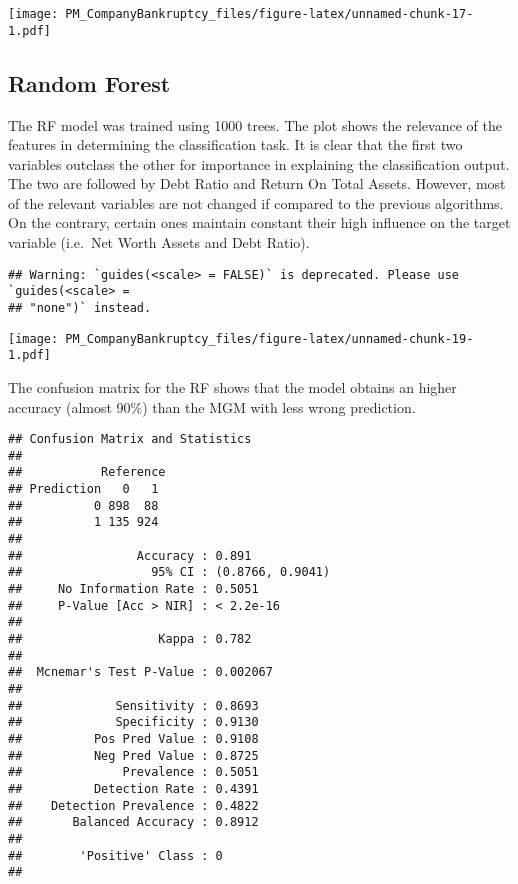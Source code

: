 \documentclass[
]{article}
\begin{document}
\texttt{[image: PM\_CompanyBankruptcy\_files/figure-latex/unnamed-chunk-17-1.pdf]}

\hypertarget{random-forest}{%
\subsection{Random Forest}\label{random-forest}}

The RF model was trained using 1000 trees. The plot shows the relevance
of the features in determining the classification task. It is clear that
the first two variables outclass the other for importance in explaining
the classification output. The two are followed by Debt Ratio and Return
On Total Assets. However, most of the relevant variables are not changed
if compared to the previous algorithms. On the contrary, certain ones
maintain constant their high influence on the target variable (i.e.~Net
Worth Assets and Debt Ratio).

\begin{verbatim}
## Warning: `guides(<scale> = FALSE)` is deprecated. Please use `guides(<scale> =
## "none")` instead.
\end{verbatim}

\texttt{[image: PM\_CompanyBankruptcy\_files/figure-latex/unnamed-chunk-19-1.pdf]}

The confusion matrix for the RF shows that the model obtains an higher
accuracy (almost 90\%) than the MGM with less wrong prediction.

\begin{verbatim}
## Confusion Matrix and Statistics
## 
##           Reference
## Prediction   0   1
##          0 898  88
##          1 135 924
##                                           
##                Accuracy : 0.891           
##                  95% CI : (0.8766, 0.9041)
##     No Information Rate : 0.5051          
##     P-Value [Acc > NIR] : < 2.2e-16       
##                                           
##                   Kappa : 0.782           
##                                           
##  Mcnemar's Test P-Value : 0.002067        
##                                           
##             Sensitivity : 0.8693          
##             Specificity : 0.9130          
##          Pos Pred Value : 0.9108          
##          Neg Pred Value : 0.8725          
##              Prevalence : 0.5051          
##          Detection Rate : 0.4391          
##    Detection Prevalence : 0.4822          
##       Balanced Accuracy : 0.8912          
##                                           
##        'Positive' Class : 0               
## 
\end{verbatim}
\end{document}

